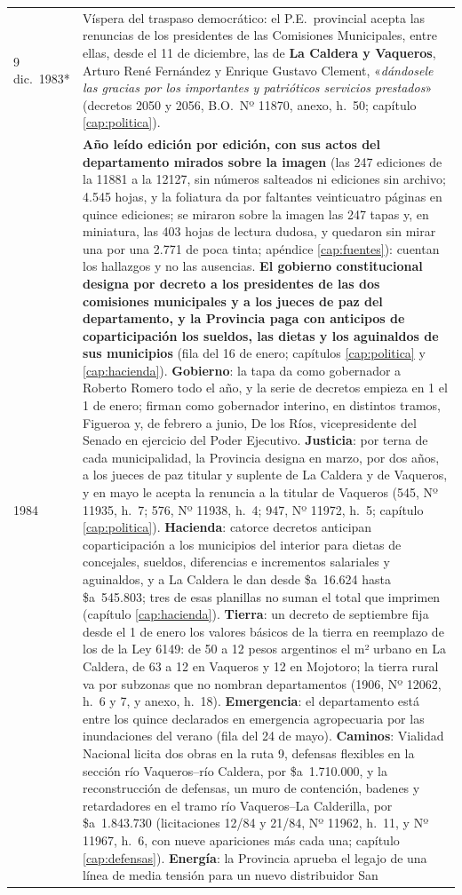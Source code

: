 \begin{longtable}{@{}p{2.7cm}p{10.3cm}@{}}
9 dic.\ 1983* & Víspera del traspaso democrático: el P.E.\ provincial acepta las renuncias de los presidentes de las Comisiones Municipales, entre ellas, desde el 11 de diciembre, las de \textbf{La Caldera y Vaqueros}, Arturo René Fernández y Enrique Gustavo Clement, «\textit{dándosele las gracias por los importantes y patrióticos servicios prestados}» (decretos 2050 y 2056, B.O.\ Nº 11870, anexo, h.\ 50; capítulo \ref{cap:politica}). \\
1984 & \textbf{Año leído edición por edición, con sus actos del departamento mirados sobre la imagen} (las 247 ediciones de la 11881 a la 12127, sin números salteados ni ediciones sin archivo; 4.545 hojas, y la foliatura da por faltantes veinticuatro páginas en quince ediciones; se miraron sobre la imagen las 247 tapas y, en miniatura, las 403 hojas de lectura dudosa, y quedaron sin mirar una por una 2.771 de poca tinta; apéndice \ref{cap:fuentes}): cuentan los hallazgos y no las ausencias. \textbf{El gobierno constitucional designa por decreto a los presidentes de las dos comisiones municipales y a los jueces de paz del departamento, y la Provincia paga con anticipos de coparticipación los sueldos, las dietas y los aguinaldos de sus municipios} (fila del 16 de enero; capítulos \ref{cap:politica} y \ref{cap:hacienda}). \textbf{Gobierno}: la tapa da como gobernador a Roberto Romero todo el año, y la serie de decretos empieza en 1 el 1 de enero; firman como gobernador interino, en distintos tramos, Figueroa y, de febrero a junio, De los Ríos, vicepresidente del Senado en ejercicio del Poder Ejecutivo. \textbf{Justicia}: por terna de cada municipalidad, la Provincia designa en marzo, por dos años, a los jueces de paz titular y suplente de La Caldera y de Vaqueros, y en mayo le acepta la renuncia a la titular de Vaqueros (545, Nº 11935, h.\ 7; 576, Nº 11938, h.\ 4; 947, Nº 11972, h.\ 5; capítulo \ref{cap:politica}). \textbf{Hacienda}: catorce decretos anticipan coparticipación a los municipios del interior para dietas de concejales, sueldos, diferencias e incrementos salariales y aguinaldos, y a La Caldera le dan desde \$a~16.624 hasta \$a~545.803; tres de esas planillas no suman el total que imprimen (capítulo \ref{cap:hacienda}). \textbf{Tierra}: un decreto de septiembre fija desde el 1 de enero los valores básicos de la tierra en reemplazo de los de la Ley 6149: de 50 a 12 pesos argentinos el m² urbano en La Caldera, de 63 a 12 en Vaqueros y 12 en Mojotoro; la tierra rural va por subzonas que no nombran departamentos (1906, Nº 12062, h.\ 6 y 7, y anexo, h.\ 18). \textbf{Emergencia}: el departamento está entre los quince declarados en emergencia agropecuaria por las inundaciones del verano (fila del 24 de mayo). \textbf{Caminos}: Vialidad Nacional licita dos obras en la ruta 9, defensas flexibles en la sección río Vaqueros--río Caldera, por \$a~1.710.000, y la reconstrucción de defensas, un muro de contención, badenes y retardadores en el tramo río Vaqueros--La Calderilla, por \$a~1.843.730 (licitaciones 12/84 y 21/84, Nº 11962, h.\ 11, y Nº 11967, h.\ 6, con nueve apariciones más cada una; capítulo \ref{cap:defensas}). \textbf{Energía}: la Provincia aprueba el legajo de una línea de media tensión para un nuevo distribuidor San 
\end{longtable}
